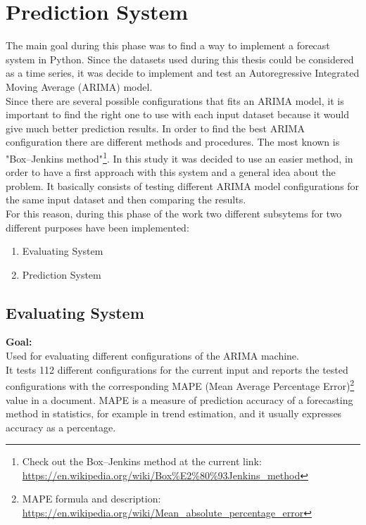 \chapter{Prediction System}
\label{PredictionSystem}
The main goal during this phase was to find a way to implement a forecast system in Python.
Since the datasets used during this thesis could be considered as a time series, it was decide to implement and test an Autoregressive Integrated Moving Average (ARIMA) model. \\
Since there are several possible configurations that fits an ARIMA model, it is important to find the right one to use with each input dataset because it would give much better prediction results.
In order to find the best ARIMA configuration there are different methods and procedures. The most known is "Box–Jenkins method"\footnote{Check out the Box–Jenkins method at the current link: \\ \url{https://en.wikipedia.org/wiki/Box\%E2\%80\%93Jenkins_method}}. In this study it was decided to use an easier method, in order to have a first approach with this system and a general idea about the problem. It basically consists of testing different ARIMA model configurations for the same input dataset and then comparing the results.\\
For this reason, during this phase of the work two different subsytems for two different purposes have been implemented:
\begin{enumerate}
\item Evaluating System
\item Prediction System
\end{enumerate}

\newpage
\section{Evaluating System}
\textbf{Goal:}\\ 
Used for evaluating different configurations of the ARIMA machine. \\ It tests 112 different configurations for the current input and reports the tested configurations with the corresponding MAPE (Mean Average Percentage Error)\footnote{MAPE formula and description: \\ \url{https://en.wikipedia.org/wiki/Mean_absolute_percentage_error}} value in a document. MAPE is a measure of prediction accuracy of a forecasting method in statistics, for example in trend estimation, and it usually expresses accuracy as a percentage.


